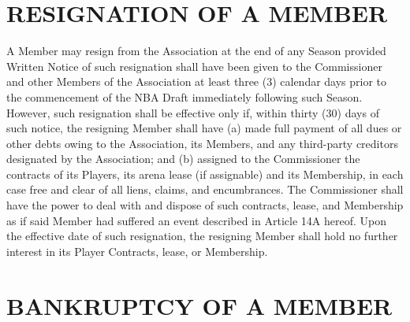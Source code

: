 \documentclass[]{book}
\begin{document}
\hypertarget{resignation-of-a-member}{%
\section{RESIGNATION OF A MEMBER}\label{resignation-of-a-member}}

A Member may resign from the Association at the end of any Season provided Written Notice of such resignation shall have been given to the Commissioner and other Members of the Association at least three (3) calendar days prior to the commencement of the NBA Draft immediately following such Season. However, such resignation shall be effective only if, within thirty (30) days of such notice, the resigning Member shall have (a) made full payment of all dues or other debts owing to the Association, its Members, and any third-party creditors designated by the Association; and (b) assigned to the Commissioner the contracts of its Players, its arena lease (if assignable) and its Membership, in each case free and clear of all liens, claims, and encumbrances. The Commissioner shall have the power to deal with and dispose of such contracts, lease, and Membership as if said Member had suffered an event described in Article 14A hereof. Upon the effective date of such resignation, the resigning Member shall hold no further interest in its Player Contracts, lease, or Membership.

\hypertarget{bankruptcy-of-a-member}{%
\section{BANKRUPTCY OF A MEMBER}\label{bankruptcy-of-a-member}}
\end{document}
